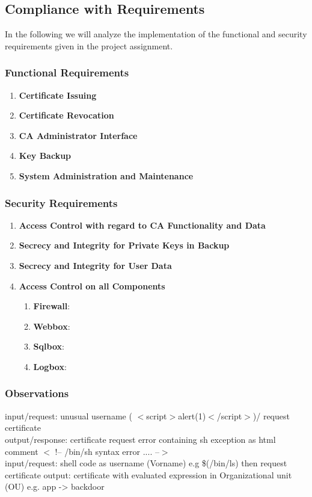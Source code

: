 \documentclass[english]{article}
\begin{document}
\subsection{Compliance with Requirements} 

In the following we will analyze the implementation of the functional and security requirements given in the project assignment.

\subsubsection{Functional Requirements}

\begin{enumerate}

\item \textbf{Certificate Issuing}
\item \textbf{Certificate Revocation} 
\item \textbf{CA Administrator Interface}
\item \textbf{Key Backup}
\item \textbf{System Administration and Maintenance}
\end{enumerate}
\subsubsection{Security Requirements}
\begin{enumerate}

\item \textbf{Access Control with regard to CA Functionality and Data}
\item \textbf{Secrecy and Integrity for Private Keys in Backup}
\item \textbf{Secrecy and Integrity for User Data}
\item \textbf{Access Control on all Components}
\begin{enumerate}[label=(\alph*)]
\item \textbf{Firewall}:
\item \textbf{Webbox}:
\item \textbf{Sqlbox}:
\item \textbf{Logbox}:
\end{enumerate}
\end{enumerate}
\subsubsection*{Observations}
input/request: unusual username ( $<$script$>$alert(1)$<$/script$>$)/ request certificate\\
output/response:  certificate request error containing sh exception as html comment $<$ !-- /bin/sh syntax error .... --$>$\\
input/request: shell code as username (Vorname) e.g \$(/bin/ls) then request certificate
output: certificate with evaluated expression in Organizational unit (OU) e.g. app -> backdoor
\end{document}
